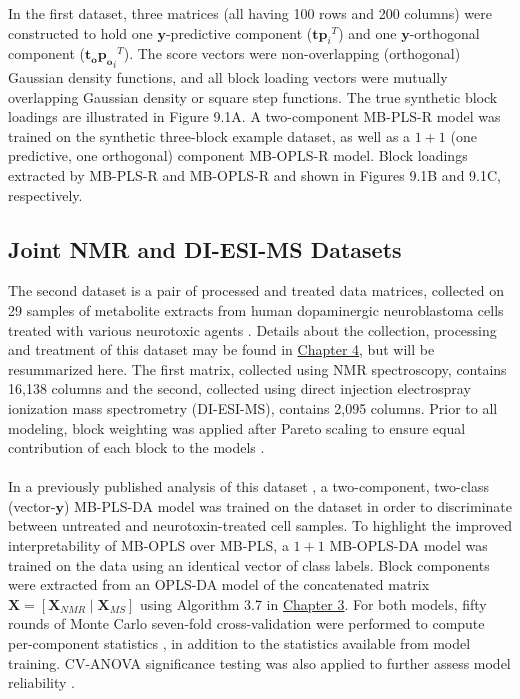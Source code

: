 \begin{doublespace}
In the first dataset, three matrices (all having 100 rows and 200 columns)
were constructed to hold one $\mathbf{y}$-predictive component
($\mathbf{t} {\mathbf{p}_i}^T$) and one $\mathbf{y}$-orthogonal component
($\mathbf{t_o} {\mathbf{p_o}_i}^T$). The score vectors were non-overlapping
(orthogonal) Gaussian density functions, and all block loading vectors were
mutually overlapping Gaussian density or square step functions. The true
synthetic block loadings are illustrated in Figure 9.1A. A two-component
MB-PLS-R model was trained on the synthetic three-block example dataset,
as well as a $1+1$ (one predictive, one orthogonal) component MB-OPLS-R
model. Block loadings extracted by MB-PLS-R and MB-OPLS-R and shown in
Figures 9.1B and 9.1C, respectively.
\end{doublespace}

\subsection{Joint \hnmr{} NMR and DI-ESI-MS Datasets}

\begin{doublespace}
The second dataset is a pair of processed and treated data matrices, collected
on 29 samples of metabolite extracts from human dopaminergic neuroblastoma
cells treated with various neurotoxic agents \cite{lei:acscb2014}. Details
about the collection, processing and treatment of this dataset may be found
in \hyperlink{section.4.3}{Chapter 4}, but will be resummarized here. The
first matrix, collected using \hnmr{} NMR spectroscopy, contains 16,138
columns and the second, collected using direct injection electrospray
ionization mass spectrometry (DI-ESI-MS), contains 2,095 columns. Prior
to all modeling, block weighting was applied after Pareto scaling to ensure
equal contribution of each block to the models \cite{smilde:jchemo2003}.
\\\\
In a previously published analysis of this dataset \cite{marshall:metab2015},
a two-component, two-class (vector-$\mathbf{y}$) MB-PLS-DA model was trained
on the dataset in order to discriminate between untreated and
neurotoxin-treated cell samples. To highlight the improved interpretability
of MB-OPLS over MB-PLS, a $1+1$ MB-OPLS-DA model was trained on the data
using an identical vector of class labels. Block components were extracted
from an OPLS-DA model of the concatenated matrix
$\mathbf{X}=[\mathbf{X}_{NMR}\mid\mathbf{X}_{MS}]$ using Algorithm 3.7 in
\hyperlink{subsection.3.5.6}{Chapter 3}. For both models, fifty rounds of
Monte Carlo seven-fold cross-validation \cite{shao:jasa1993,xu:cils2001}
were performed to compute per-component \qsq{} statistics
\cite{wold:cils2001}, in addition to the \rsq{} statistics available
from model training. CV-ANOVA significance testing was also applied
to further assess model reliability \cite{eriksson:jchemo2008}.
\end{doublespace}


